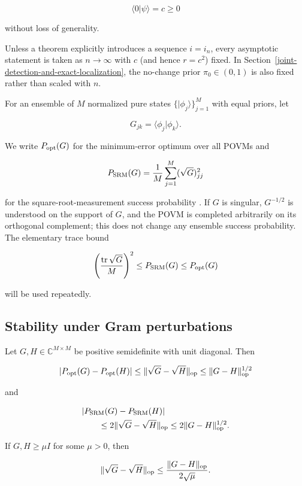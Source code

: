\[
\langle0|\psi\rangle=c\ge0
\]

without loss of generality.

Unless a theorem explicitly introduces a sequence \(i=i_n\), every
asymptotic statement is taken as \(n\to\infty\) with \(c\) (and hence
\(r=c^2\)) fixed. In Section~\ref{joint-detection-and-exact-localization},
the no-change prior \(\pi_0\in(0,1)\) is also fixed rather than scaled with
\(n\).

For an ensemble of \(M\) normalized pure states \(\{|\phi_j\rangle\}_{j=1}^M\) with equal priors, let

\[
G_{jk}=\langle\phi_j|\phi_k\rangle.
\]

We write \(P_{\rm opt}(G)\) for the minimum-error optimum over all POVMs
\cite{helstrom1976,holevo1973,yuen1975,barnett2009} and

\[
P_{\rm SRM}(G)=\frac1M\sum_{j=1}^M(\sqrt G)_{jj}^2
\]

for the square-root-measurement success probability
\cite{hausladen1994,eldar2001,dallapozza2015}. If \(G\) is singular,
\(G^{-1/2}\) is understood on the support of \(G\), and the POVM is completed
arbitrarily on its orthogonal complement; this does not change any ensemble
success probability. The elementary trace bound

\begin{equation}\label{eq:trace-srm-bound}
\left(\frac{\operatorname{tr}\sqrt G}{M}\right)^2
\le P_{\rm SRM}(G)\le P_{\rm opt}(G)
\end{equation}

will be used repeatedly.

\subsection{Stability under Gram perturbations}\label{stability-under-gram-perturbations}

\begin{lemma}\label{lem:gram-stability}
Let \(G,H\in\mathbb C^{M\times M}\) be positive semidefinite with unit diagonal. Then

\begin{equation}\label{eq:opt-gram-stability}
|P_{\rm opt}(G)-P_{\rm opt}(H)|
\le \|\sqrt G-\sqrt H\|_{\rm op}
\le \|G-H\|_{\rm op}^{1/2}
\end{equation}

and

\begin{align}\label{eq:srm-gram-stability}
&|P_{\rm SRM}(G)-P_{\rm SRM}(H)| \notag\\
&\qquad\le2\|\sqrt G-\sqrt H\|_{\rm op}
\le2\|G-H\|_{\rm op}^{1/2}.
\end{align}

If \(G,H\ge \mu I\) for some \(\mu>0\), then

\begin{equation}\label{eq:sqrt-lipschitz}
\|\sqrt G-\sqrt H\|_{\rm op}
\le \frac{\|G-H\|_{\rm op}}{2\sqrt\mu}.
\end{equation}
\end{lemma}

